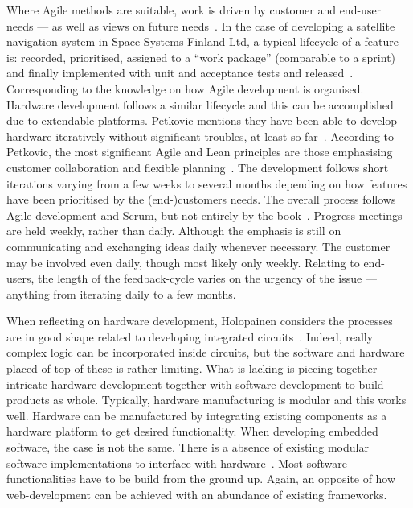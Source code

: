 \documentclass[english]{tktltiki2}
\begin{document}
Where Agile methods are suitable, work is driven by customer and end-user needs — as well as views on future needs~\cite{BT15, Pet15}. In the case of developing a satellite navigation system in Space Systems Finland Ltd, a typical lifecycle of a feature is: recorded, prioritised, assigned to a “work package” (comparable to a sprint) and finally implemented with unit and acceptance tests and released~\cite{Pet15}. Corresponding to the knowledge on how Agile development is organised. Hardware development follows a similar lifecycle and this can be accomplished due to extendable platforms. Petkovic mentions they have been able to develop hardware iteratively without significant troubles, at least so far~\cite{Pet15}. According to Petkovic, the most significant Agile and Lean principles are those emphasising customer collaboration and flexible planning~\cite{Pet15}. The development follows short iterations varying from a few weeks to several months depending on how features have been prioritised by the (end-)customers needs. The overall process follows Agile development and Scrum, but not entirely by the book~\cite{Pet15}. Progress meetings are held weekly, rather than daily. Although the emphasis is still on communicating and exchanging ideas daily whenever necessary. The customer may be involved even daily, though most likely only weekly. Relating to end-users, the length of the feedback-cycle varies on the urgency of the issue — anything from iterating daily to a few months.

When reflecting on hardware development, Holopainen considers the processes are in good shape related to developing integrated circuits~\cite{Hol15a}. Indeed, really complex logic can be incorporated inside circuits, but the software and hardware placed of top of these is rather limiting. What is lacking is piecing together intricate hardware development together with software development to build products as whole. Typically, hardware manufacturing is modular and this works well. Hardware can be manufactured by integrating existing components as a hardware platform to get desired functionality. When developing embedded software, the case is not the same. There is a absence of existing modular software implementations to interface with hardware~\cite{Hol15a}. Most software functionalities have to be build from the ground up. Again, an opposite of how web-development can be achieved with an abundance of existing frameworks.
\end{document}

